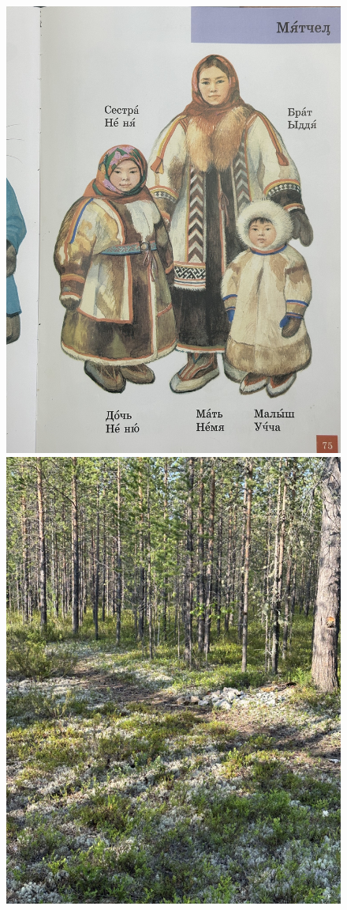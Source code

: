 \documentclass[a4paper, 12pt]{article}
\begin{document}
	\begin{figure}[H]
		\centering
		\includegraphics[scale=.063]{nenets-women}
		\hfill
		\includegraphics[scale=.198]{tundra}

\end{figure}
\end{document}
